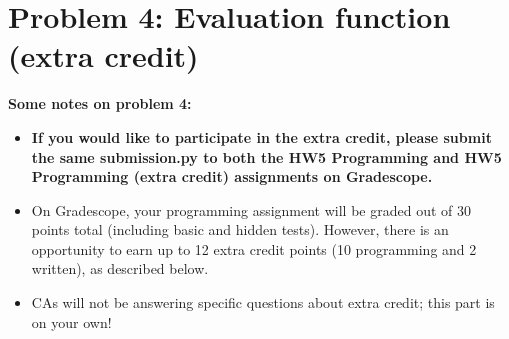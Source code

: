 \documentclass{article}
\theoremstyle{case}
\theoremstyle{definition}
\begin{document}
\newpage
\section*{Problem 4: Evaluation function (extra credit)}
  \textbf{Some notes on problem 4:}
  \begin{itemize}
      \item \textbf{If you would like to participate in the extra credit, please submit the same submission.py to both the HW5 Programming and HW5 Programming (extra credit) assignments on Gradescope.}
      \item On Gradescope, your programming assignment will be graded out of 30 points total (including basic and hidden tests). However, there is an opportunity to earn up to 12 extra credit points (10 programming and 2 written), as described below.
      \item CAs will not be answering specific questions about extra credit; this part is on your own!
  \end{itemize}
  
\end{document}
